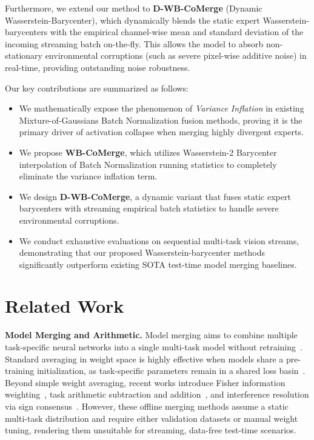 \documentclass{article}
\theoremstyle{plain}
\theoremstyle{definition}
\theoremstyle{remark}
\begin{document}
Furthermore, we extend our method to \textbf{D-WB-CoMerge} (Dynamic Wasserstein-Barycenter), which dynamically blends the static expert Wasserstein-barycenters with the empirical channel-wise mean and standard deviation of the incoming streaming batch on-the-fly. This allows the model to absorb non-stationary environmental corruptions (such as severe pixel-wise additive noise) in real-time, providing outstanding noise robustness.

Our key contributions are summarized as follows:
\begin{itemize}
  \item We mathematically expose the phenomenon of \emph{Variance Inflation} in existing Mixture-of-Gaussians Batch Normalization fusion methods, proving it is the primary driver of activation collapse when merging highly divergent experts.
  \item We propose \textbf{WB-CoMerge}, which utilizes Wasserstein-2 Barycenter interpolation of Batch Normalization running statistics to completely eliminate the variance inflation term.
  \item We design \textbf{D-WB-CoMerge}, a dynamic variant that fuses static expert barycenters with streaming empirical batch statistics to handle severe environmental corruptions.
  \item We conduct exhaustive evaluations on sequential multi-task vision streams, demonstrating that our proposed Wasserstein-barycenter methods significantly outperform existing SOTA test-time model merging baselines.
\end{itemize}

\section{Related Work}
\label{sec:related}

\textbf{Model Merging and Arithmetic.} Model merging aims to combine multiple task-specific neural networks into a single multi-task model without retraining~\cite{wortsman2022model,ainsworth2023git}. Standard averaging in weight space is highly effective when models share a pre-training initialization, as task-specific parameters remain in a shared loss basin~\cite{choshen2022fusing}. Beyond simple weight averaging, recent works introduce Fisher information weighting~\cite{matena2022merging}, task arithmetic subtraction and addition~\cite{ilharco2022editing}, and interference resolution via sign consensus~\cite{yadav2023ties}. However, these offline merging methods assume a static multi-task distribution and require either validation datasets or manual weight tuning, rendering them unsuitable for streaming, data-free test-time scenarios.
\end{document}

